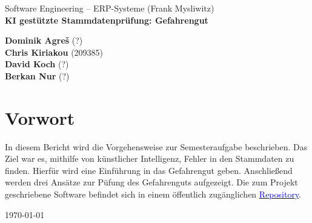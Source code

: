 \begin{titlepage}
    \begin{flushleft}
        Software Engineering -- ERP-Systeme (Frank Mysliwitz)\\

        \huge
        \textbf{KI gestützte Stammdatenprüfung: Gefahrengut}\\
        \vspace{1,5cm}

        \Large
        \textbf{Dominik Agreš} {\small (?)}\\
        \textbf{Chris Kiriakou} {\small (209385)}\\
        \textbf{David Koch} {\small (?)}\\
        \textbf{Berkan Nur} {\small (?)}\\
        \vspace{1,5cm}
        
        \large
        \section*{Vorwort}
        In diesem Bericht wird die Vorgehensweise zur Semesteraufgabe beschrieben.
        Das Ziel war es, mithilfe von künstlicher Intelligenz, Fehler in den Stammdaten zu
        finden. Hierfür wird eine Einführung in das Gefahrengut geben. Anschließend werden
        drei Ansätze zur Püfung des Gefahrenguts aufgezeigt. 
        Die zum Projekt geschriebene Software befindet sich in einem öffentlich 
        zugänglichen \href{https://github.com/ckiri/wetterstation}{\textcolor{blue}{Repository}}.\\

        \vspace{2,5cm}

        \today \\

        \vspace{3,5cm}
    \end{flushleft}
\end{titlepage}
